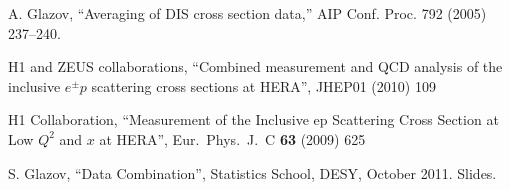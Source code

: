 \begin{thebibliography}{99}

 A. Glazov, 
 ``Averaging of DIS cross section data,''
  AIP Conf. Proc. 792 (2005) 237--240.
  
H1 and ZEUS collaborations, ``Combined measurement and QCD analysis of the inclusive $e^{\pm}p$ scattering cross sections at HERA'', JHEP01 (2010) 109

H1 Collaboration, ``Measurement of the Inclusive ep Scattering Cross Section at Low $Q^2$ and $x$ at HERA'', Eur.\ Phys.\ J.\ C {\bf 63} (2009) 625

S. Glazov, ``Data Combination'', Statistics School, DESY, October 2011. Slides.
\end{thebibliography}